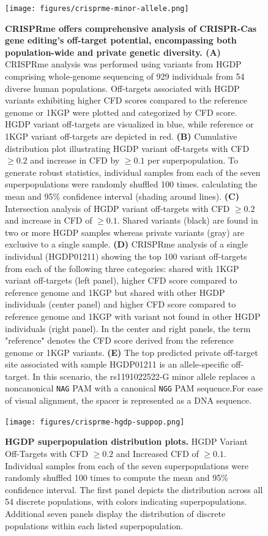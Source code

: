 \documentclass[a4paper, titlepage, openright]{book}
\newcommand{\crisprme}{CRISPRme\xspace}
\begin{document}
\begin{figure}[!]
	\centering
	\texttt{[image: figures/crisprme-minor-allele.png]}
	\caption[\crisprme offers comprehensive analysis of CRISPR-Cas gene editing's off-target potential, encompassing both population-wide and private genetic diversity]{\textbf{\crisprme offers comprehensive analysis of CRISPR-Cas gene editing's off-target potential, encompassing both population-wide and private genetic diversity. (A)} \crisprme analysis was performed using variants from HGDP comprising whole-genome sequencing of 929 individuals from 54 diverse human populations. Off-targets associated with HGDP variants exhibiting higher CFD scores compared to the reference genome or 1KGP were plotted and categorized by CFD score. HGDP variant off-targets are visualized in blue, while reference or 1KGP variant off-targets are depicted in red. \textbf{(B)} Cumulative distribution plot illustrating HGDP variant off-targets with CFD $\geq 0.2$ and increase in CFD by $\geq 0.1$ per superpopulation. To generate robust statistics, individual samples from each of the seven superpopulations were randomly shuffled 100 times. calculating the mean and 95\% confidence interval (shading around lines). \textbf{(C)} Intersection analysis of HGDP variant off-targets with CFD $\geq 0.2$ and increase in CFD of $\geq 0.1$. Shared variants (black) are found in two or more HGDP samples whereas private variants (gray) are exclusive to a single sample. \textbf{(D)} \crisprme analysis of a single individual (HGDP01211) showing the top 100 variant off-targets from each of the following three categories: shared with 1KGP variant off-targets (left panel), higher CFD score compared to reference genome and 1KGP but shared with other HGDP individuals (center panel) and higher CFD score compared to reference genome and 1KGP with variant not found in other HGDP individuals (right panel). In the center and right panels, the term "reference" denotes the CFD score derived from the reference genome or 1KGP variants. \textbf{(E)} The top predicted private off-target site associated with sample HGDP01211 is an allele-specific off-target. In this scenario, the rs1191022522-G minor allele replaces a noncanonical \texttt{NAG} PAM with a canonical \texttt{NGG} PAM sequence.For ease of visual alignment, the spacer is represented as a DNA sequence.}
	\label{fig:crisprme-minor-allele}
\end{figure}
%
\begin{figure}
	\centering
	\texttt{[image: figures/crisprme-hgdp-suppop.png]}
	\caption[HGDP superpopulation distribution plots]{\textbf{HGDP superpopulation distribution plots.} HGDP Variant Off-Targets with CFD $\geq 0.2$ and Increased CFD of $\geq 0.1$. Individual samples from each of the seven superpopulations were randomly shuffled 100 times to compute the mean and 95\% confidence interval. The first panel depicts the distribution across all 54 discrete populations, with colors indicating superpopulations. Additional seven panels display the distribution of discrete populations within each listed superpopulation.}
	\label{fig:crisprme-hgdp-suppop}
\end{figure}
\end{document}
